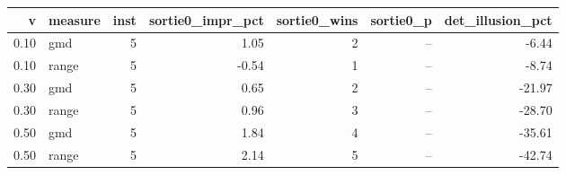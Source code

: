 \begin{tabular}{rlrrrrr}
\toprule
v & measure & inst & sortie0_impr_pct & sortie0_wins & sortie0_p & det_illusion_pct \\
\midrule
0.10 & gmd & 5 & 1.05 & 2 & -- & -6.44 \\
0.10 & range & 5 & -0.54 & 1 & -- & -8.74 \\
0.30 & gmd & 5 & 0.65 & 2 & -- & -21.97 \\
0.30 & range & 5 & 0.96 & 3 & -- & -28.70 \\
0.50 & gmd & 5 & 1.84 & 4 & -- & -35.61 \\
0.50 & range & 5 & 2.14 & 5 & -- & -42.74 \\
\bottomrule
\end{tabular}
